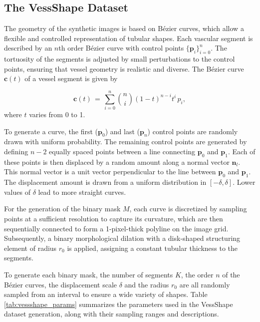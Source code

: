 \documentclass[%
reprint,
nofootinbib,
 amsmath,amssymb,
aps,
superscriptaddress,
showkeys,
longbibliography
]{revtex4-1}
\begin{document}
\subsection{The VessShape Dataset}

The geometry of the synthetic images is based on Bézier curves, which allow a flexible and controlled representation of tubular shapes. Each vascular segment is described by an $n$th order Bézier curve with control points $\{\mathbf{p}_i\}_{i=0}^n$. The tortuosity of the segments is adjusted by small perturbations to the control points, ensuring that vessel geometry is realistic and diverse. The Bézier curve $\mathbf{c}(t)$ of a vessel segment is given by

\begin{equation}
\mathbf{c}(t) \,=\, \sum_{i=0}^{n} \binom{n}{i} (1-t)^{n-i} t^{i} \, p_i,
\label{eq:bezier}
\end{equation}
where $t$ varies from 0 to 1. 

To generate a curve, the first ($\mathbf{p}_0$) and last ($\mathbf{p}_n$) control points are randomly drawn with uniform probability. The remaining control points are generated by defining $n-2$ equally spaced points between a line connecting $\mathbf{p}_0$ and $\mathbf{p}_1$. Each of these points is then displaced by a random amount along a normal vector $\mathbf{n}_l$. This normal vector is a unit vector perpendicular to the line between $\mathbf{p}_0$ and $\mathbf{p}_1$. The displacement amount is drawn from a uniform distribution in $[-\delta,\delta]$. Lower values of $\delta$ lead to more straight curves.

For the generation of the binary mask $M$, each curve is discretized by sampling points at a sufficient resolution to capture its curvature, which are then sequentially connected to form a 1-pixel-thick polyline on the image grid. Subsequently, a binary morphological dilation with a disk-shaped structuring element of radius $r_0$ is applied, assigning a constant tubular thickness to the segments. 

To generate each binary mask, the number of segments $K$, the order $n$ of the Bézier curves, the displacement scale $\delta$ and the radius $r_0$ are all randomly sampled from an interval to ensure a wide variety of shapes. Table \ref{tab:vessshape_params} summarizes the parameters used in the VessShape dataset generation, along with their sampling ranges and descriptions.
\end{document}
